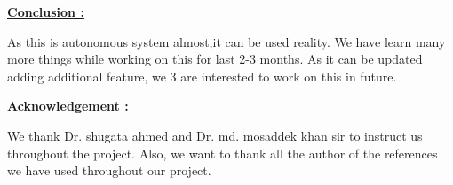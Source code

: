 \documentclass[12pt]{article}
\begin{document}
\vspace{\baselineskip}
{\fontsize{18pt}{21.6pt}\selectfont \textbf{\uline{Conclusion :} }{\fontsize{14pt}{16.8pt}\selectfont  As this is autonomous system almost,it can be used reality. We have learn many more things while working on this for last 2-3 months. As it can be updated adding additional feature, we 3 are interested to work on this in future.\par}\par}\par


\vspace{\baselineskip}
{\fontsize{18pt}{21.6pt}\selectfont \textbf{\uline{Acknowledgement :} }{\fontsize{14pt}{16.8pt}\selectfont  We thank Dr. shugata ahmed and Dr. md. mosaddek khan sir to instruct us throughout the project. Also, we want to thank all the author of the references we have used throughout our project.\par}\par}\par


\vspace{\baselineskip}

\vspace{\baselineskip}
\vspace{\baselineskip}
\printbibliography
\end{document}
